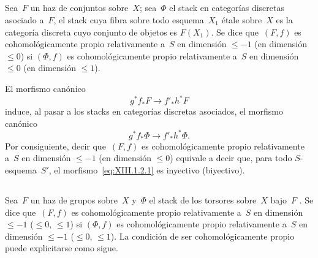 \setcounter{subsection}{1}%
\subsection{}
\label{XIII.1.2}
Sea~$F$ un haz de conjuntos sobre~$X$; sea~$\Phi$ el stack en categorías
discretas asociado a~$F$, \ie el stack cuya fibra sobre todo esquema~$X_1$
étale sobre~$X$ es la categoría discreta cuyo conjunto de objetos es
$F(X_1)$. Se dice que~$(F,f)$ es cohomológicamente propio relativamente
a~$S$ en dimensión $\leqslant -1$ (\resp en dimensión $\leqslant 0$) si
$(\Phi,f)$ es cohomológicamente propio relativamente a~$S$ en dimensión
$\leqslant 0$ (\resp en dimensión $\leqslant 1$).

El
morfismo canónico
\begin{equation*}
\label{eq:XIII.1.2.1}
\tag{\thesubsection.1} { g^* f_* F \to f'_* h^* F }
\end{equation*}
induce, al pasar a los stacks en categorías discretas asociados, el
morfismo canónico
$$
g^* f_* \Phi \to f'_* h^* \Phi \text{.}
$$
Por consiguiente, decir que~$(F,f)$ es cohomológicamente propio
relativamente a~$S$ en dimensión $\leqslant -1$ (\resp en dimensión
$\leqslant 0$) equivale a decir que, para todo $S$-esquema~$S'$, el
morfismo~\eqref{eq:XIII.1.2.1} es inyectivo (\resp biyectivo).

\subsection{}
\label{XIII.1.3}
Sea~$F$ un haz de grupos sobre~$X$ y~$\Phi$ el stack de los torsores
sobre~$X$ bajo~$F$ \cite[II 2.3.2]{XIII.1}. Se dice que~$(F,f)$ es
cohomológicamente propio relativamente a~$S$ en dimensión
$\leqslant -1$ (\resp $\leqslant 0$, \resp $\leqslant 1$) si
$(\Phi,f)$ es cohomológicamente propio relativamente a~$S$ en dimensión
$\leqslant -1$ (\resp $\leqslant 0$, \resp $\leqslant 1$). La condición
de ser cohomológicamente propio puede explicitarse como sigue.


